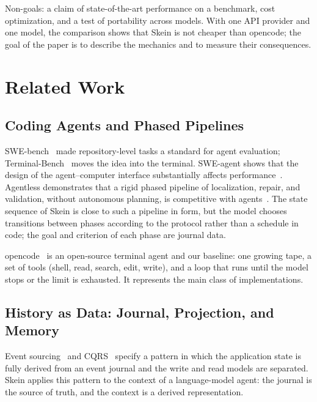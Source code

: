 \documentclass[11pt,a4paper]{article}
\begin{document}
Non-goals: a claim of state-of-the-art performance on a benchmark, cost optimization, and a test
of portability across models. With one API provider and one model, the comparison shows that
Skein is not cheaper than opencode; the goal of the paper is to describe the mechanics and to
measure their consequences.

\section{Related Work}

\subsection{Coding Agents and Phased Pipelines}

SWE-bench~\cite{jimenez2024swebench} made repository-level tasks a standard for agent evaluation; Terminal-Bench~\cite{terminalbench} moves the idea into the terminal. SWE-agent shows
that the design of the agent--computer interface substantially affects
performance~\cite{yang2024sweagent}. Agentless demonstrates that a rigid phased pipeline of
localization, repair, and validation, without autonomous planning, is competitive with
agents~\cite{xia2024agentless}. The state sequence of Skein is close to such a pipeline in
form, but the model chooses transitions between phases according to the protocol rather than a
schedule in code; the goal and criterion of each phase are journal data.

opencode~\cite{opencode} is an open-source terminal agent and our baseline: one growing tape, a
set of tools (shell, read, search, edit, write), and a loop that runs until the model stops or
the limit is exhausted. It represents the main class of implementations.

\subsection{History as Data: Journal, Projection, and Memory}

Event sourcing~\cite{fowler2005event} and CQRS~\cite{fowler2011cqrs} specify a pattern in which
the application state is fully derived from an event journal and the write and read models are
separated. Skein applies this pattern to the context of a language-model agent: the journal is
the source of truth, and the context is a derived representation.
\end{document}
